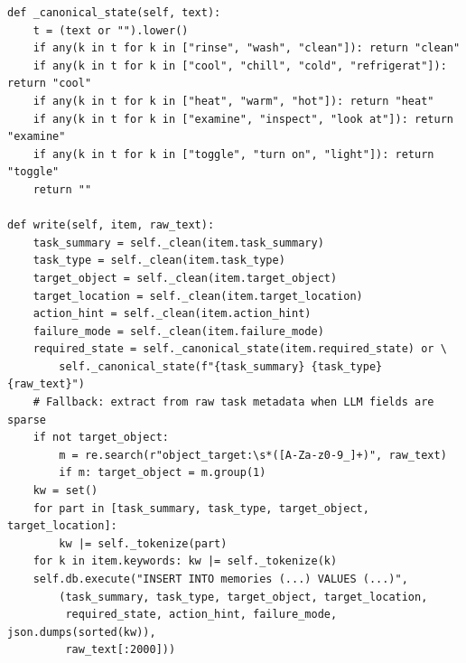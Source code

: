 \begin{lstlisting}[style=evolvedcode, caption={\textcolor{red}{[Revised]} ALFWorld evolved \texttt{write()} --- canonical state extraction and fallback parsing.}, label=lst:alf-write]
def _canonical_state(self, text):
    t = (text or "").lower()
    if any(k in t for k in ["rinse", "wash", "clean"]): return "clean"
    if any(k in t for k in ["cool", "chill", "cold", "refrigerat"]): return "cool"
    if any(k in t for k in ["heat", "warm", "hot"]): return "heat"
    if any(k in t for k in ["examine", "inspect", "look at"]): return "examine"
    if any(k in t for k in ["toggle", "turn on", "light"]): return "toggle"
    return ""

def write(self, item, raw_text):
    task_summary = self._clean(item.task_summary)
    task_type = self._clean(item.task_type)
    target_object = self._clean(item.target_object)
    target_location = self._clean(item.target_location)
    action_hint = self._clean(item.action_hint)
    failure_mode = self._clean(item.failure_mode)
    required_state = self._canonical_state(item.required_state) or \
        self._canonical_state(f"{task_summary} {task_type} {raw_text}")
    # Fallback: extract from raw task metadata when LLM fields are sparse
    if not target_object:
        m = re.search(r"object_target:\s*([A-Za-z0-9_]+)", raw_text)
        if m: target_object = m.group(1)
    kw = set()
    for part in [task_summary, task_type, target_object, target_location]:
        kw |= self._tokenize(part)
    for k in item.keywords: kw |= self._tokenize(k)
    self.db.execute("INSERT INTO memories (...) VALUES (...)",
        (task_summary, task_type, target_object, target_location,
         required_state, action_hint, failure_mode, json.dumps(sorted(kw)),
         raw_text[:2000]))
\end{lstlisting}


